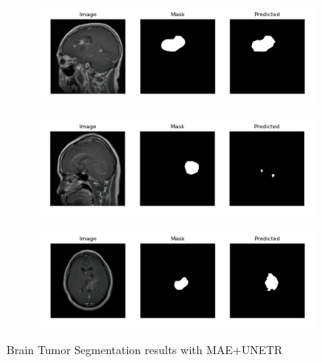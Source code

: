 \begin{figure}[]
    \centering
    \begin{subfigure}{1\textwidth}
        \centering
        \includegraphics[width=\linewidth]{images/results/BTS-mae6.png}
        \subcaption{}
        \label{fig:bts-mae1}
    \end{subfigure}
    \vspace{1em}   
    \begin{subfigure}{1\textwidth}
        \centering
        \includegraphics[width=\linewidth]{images/results/BTS-maecannato.png}
        \subcaption{}
        \label{fig:bts-mae2}
    \end{subfigure}
    \vspace{1em}   
    \begin{subfigure}{1\textwidth}
        \centering
        \includegraphics[width=\linewidth]{images/results/BTS-mae3.png}
        \subcaption{}
        \label{fig:bts-mae3}
    \end{subfigure}
    \caption{Brain Tumor Segmentation results with MAE+UNETR}
    \label{fig:bts-mae}
\end{figure}

